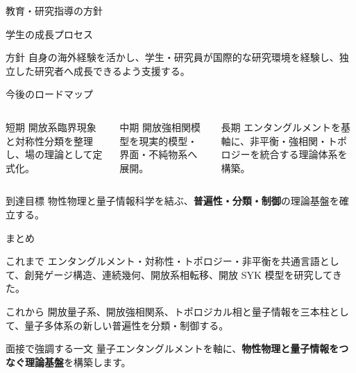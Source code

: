 \documentclass[aspectratio=169,11pt]{beamer}
\newcommand{\key}[1]{\textcolor{accent}{\bfseries #1}}
\begin{document}
\begin{frame}{教育・研究指導の方針}
\begin{block}{学生の成長プロセス}
\centering
{}
\end{block}
\begin{block}{方針}
自身の海外経験を活かし、学生・研究員が国際的な研究環境を経験し、独立した研究者へ成長できるよう支援する。
\end{block}
\end{frame}

\begin{frame}{今後のロードマップ}
\begin{columns}[T]
\begin{block}{短期}
開放系臨界現象と対称性分類を整理し、場の理論として定式化。
\end{block}
\begin{block}{中期}
開放強相関模型を現実的模型・界面・不純物系へ展開。
\end{block}
\begin{block}{長期}
エンタングルメントを基軸に、非平衡・強相関・トポロジーを統合する理論体系を構築。
\end{block}
\end{columns}
\vspace{0.8em}
\begin{block}{到達目標}
\centering
物性物理と量子情報科学を結ぶ、\key{普遍性・分類・制御}の理論基盤を確立する。
\end{block}
\end{frame}

\begin{frame}{まとめ}
\begin{block}{これまで}
エンタングルメント・対称性・トポロジー・非平衡を共通言語として、創発ゲージ構造、連続幾何、開放系相転移、開放 SYK 模型を研究してきた。
\end{block}
\begin{block}{これから}
開放量子系、開放強相関系、トポロジカル相と量子情報を三本柱として、量子多体系の新しい普遍性を分類・制御する。
\end{block}
\begin{alertblock}{面接で強調する一文}
\centering
\Large 量子エンタングルメントを軸に、\key{物性物理と量子情報をつなぐ理論基盤}を構築します。
\end{alertblock}
\end{frame}
\end{document}
